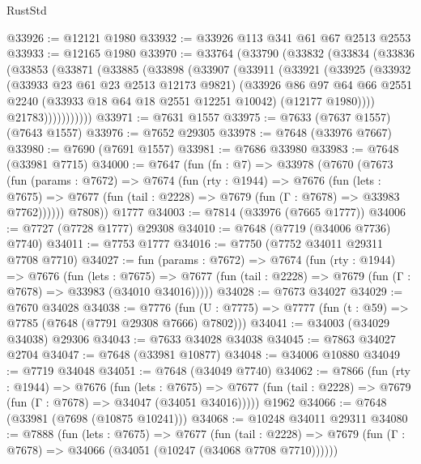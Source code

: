 \begin{lexlean}{RustStd}
\begin{coremodule}
@33926 := @12121 @1980
@33932 := @33926 @113 @341 @61 @67 @2513 @2553
@33933 := @12165 @1980
@33970 := @33764
    (@33790
      (@33832
        (@33834
          (@33836
            (@33853
              (@33871
                (@33885
                  (@33898
                    (@33907
                      (@33911
                        (@33921
                          (@33925
                            (@33932
                              (@33933 @23 @61 @23 @2513 @12173 @9821)
                              (@33926
                                @86
                                @97
                                @64
                                @66
                                @2551
                                @2240
                                (@33933 @18 @64 @18 @2551 @12251 @10042)
                                (@12177 @1980))))
                          @21783)))))))))))
@33971 := @7631 @1557
@33975 := @7633 (@7637 @1557) (@7643 @1557)
@33976 := @7652 @29305
@33978 := @7648 (@33976 @7667)
@33980 := @7690 (@7691 @1557)
@33981 := @7686 @33980
@33983 := @7648 (@33981 @7715)
@34000 := @7647
    (fun (fn : @7) =>
    @33978
      (@7670
        (@7673
          (fun (params : @7672) =>
          @7674
            (fun (rty : @1944) =>
            @7676
              (fun (lets : @7675) =>
              @7677 (fun (tail : @2228) => @7679 (fun (Γ : @7678) => @33983 @7762))))))
        @7808))
    @1777
@34003 := @7814 (@33976 (@7665 @1777))
@34006 := @7727 (@7728 @1777) @29308
@34010 := @7648 (@7719 (@34006 @7736) @7740)
@34011 := @7753 @1777
@34016 := @7750 (@7752 @34011 @29311 @7708 @7710)
@34027 := fun (params : @7672) =>
  @7674
    (fun (rty : @1944) =>
    @7676
      (fun (lets : @7675) =>
      @7677 (fun (tail : @2228) => @7679 (fun (Γ : @7678) => @33983 (@34010 @34016)))))
@34028 := @7673 @34027
@34029 := @7670 @34028
@34038 := @7776
    (fun (U : @7775) => @7777 (fun (t : @59) => @7785 (@7648 (@7791 @29308 @7666) @7802)))
@34041 := @34003 (@34029 @34038) @29306
@34043 := @7633 @34028 @34038
@34045 := @7863 @34027 @2704
@34047 := @7648 (@33981 @10877)
@34048 := @34006 @10880
@34049 := @7719 @34048
@34051 := @7648 (@34049 @7740)
@34062 := @7866
    (fun (rty : @1944) =>
    @7676
      (fun (lets : @7675) =>
      @7677 (fun (tail : @2228) => @7679 (fun (Γ : @7678) => @34047 (@34051 @34016)))))
    @1962
@34066 := @7648 (@33981 (@7698 (@10875 @10241)))
@34068 := @10248 @34011 @29311
@34080 := @7888
    (fun (lets : @7675) =>
    @7677
      (fun (tail : @2228) =>
      @7679 (fun (Γ : @7678) => @34066 (@34051 (@10247 (@34068 @7708 @7710))))))

\end{coremodule}
\end{lexlean}
